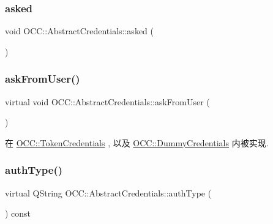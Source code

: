 \subsubsection{\texorpdfstring{asked}{asked}}
{\footnotesize\ttfamily void O\+C\+C\+::\+Abstract\+Credentials\+::asked (\begin{DoxyParamCaption}{ }\end{DoxyParamCaption})\hspace{0.3cm}{\ttfamily [signal]}}

\mbox{\label{class_o_c_c_1_1_abstract_credentials_ade846fa97d67c4fd368e01acebd8c977}} 
\subsubsection{\texorpdfstring{ask\+From\+User()}{askFromUser()}}
{\footnotesize\ttfamily virtual void O\+C\+C\+::\+Abstract\+Credentials\+::ask\+From\+User (\begin{DoxyParamCaption}{ }\end{DoxyParamCaption})\hspace{0.3cm}{\ttfamily [pure virtual]}}



在 \hyperlink{class_o_c_c_1_1_token_credentials_a789e2534ba7df8f349903bb5b2a39167}{O\+C\+C\+::\+Token\+Credentials} , 以及 \hyperlink{class_o_c_c_1_1_dummy_credentials_aa75b74ddf9cbabb2d1fe95b7e641b2aa}{O\+C\+C\+::\+Dummy\+Credentials} 内被实现.

\mbox{\label{class_o_c_c_1_1_abstract_credentials_a47219fcdd7ecc614803d024c361b9c16}} 
\subsubsection{\texorpdfstring{auth\+Type()}{authType()}}
{\footnotesize\ttfamily virtual Q\+String O\+C\+C\+::\+Abstract\+Credentials\+::auth\+Type (\begin{DoxyParamCaption}{ }\end{DoxyParamCaption}) const\hspace{0.3cm}{\ttfamily [pure virtual]}}



